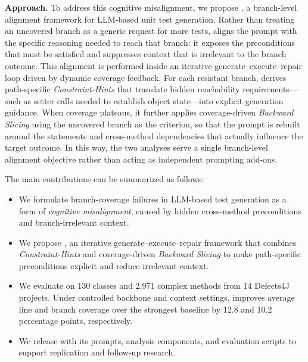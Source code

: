 \textbf{Approach.}
To address this cognitive misalignment, we propose \ourmethod{}, a branch-level alignment framework for LLM-based unit test generation. Rather than treating an uncovered branch as a generic request for more tests, \ourmethod{} aligns the prompt with the specific reasoning needed to reach that branch: it exposes the preconditions that must be satisfied and suppresses context that is irrelevant to the branch outcome.
This alignment is performed inside an iterative generate--execute--repair loop driven by dynamic coverage feedback. For each resistant branch, \ourmethod{} derives path-specific \textit{Constraint-Hints} that translate hidden reachability requirements---such as setter calls needed to establish object state---into explicit generation guidance. When coverage plateaus, it further applies coverage-driven \textit{Backward Slicing} using the uncovered branch as the criterion, so that the prompt is rebuilt around the statements and cross-method dependencies that actually influence the target outcome. In this way, the two analyses serve a single branch-level alignment objective rather than acting as independent prompting add-ons.

The main contributions can be summarized as follows:
\begin{itemize}[leftmargin=*]
\item We formulate branch-coverage failures in LLM-based test generation as a form of \emph{cognitive misalignment}, caused by hidden cross-method preconditions and branch-irrelevant context.

\item We propose \ourmethod{}, an iterative generate--execute--repair framework that combines \emph{Constraint-Hints} and coverage-driven \emph{Backward Slicing} to make path-specific preconditions explicit and reduce irrelevant context.

\item We evaluate \ourmethod{} on 130 classes and 2{,}971 complex methods from 14 Defects4J projects. Under controlled backbone and context settings, \ourmethod{} improves average line and branch coverage over the strongest baseline by 12.8 and 10.2 percentage points, respectively.

\item We release \ourmethod{} with its prompts, analysis components, and evaluation scripts to support replication and follow-up research.
\end{itemize}
